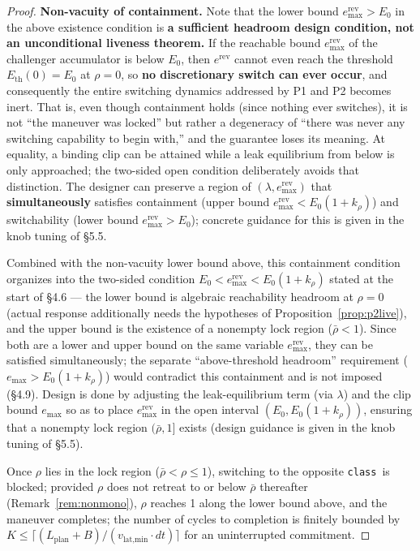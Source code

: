 \documentclass[11pt]{article}
\newcommand{\Class}{\texttt{class}}
\newcommand{\Erev}{e^{\text{rev}}}
\newcommand{\Eremax}{e^{\text{rev}}_{\max}}
\newcommand{\Eth}{E_{\text{th}}}
\begin{document}
\begin{proof}
\textbf{Non-vacuity of containment.} Note that the lower bound $\Eremax > E_0$ in the above existence condition is \textbf{a sufficient headroom design condition, not an unconditional liveness theorem.} If the reachable bound $\Eremax$ of the challenger accumulator is below $E_0$, then $\Erev$ cannot even reach the threshold $\Eth(0) = E_0$ at $\rho=0$, so \textbf{no discretionary switch can ever occur}, and consequently the entire switching dynamics addressed by P1 and P2 becomes inert. That is, even though containment holds (since nothing ever switches), it is not ``the maneuver was locked'' but rather a degeneracy of ``there was never any switching capability to begin with,'' and the guarantee loses its meaning. At equality, a binding clip can be attained while a leak equilibrium from below is only approached; the two-sided open condition deliberately avoids that distinction. The designer can preserve a region of $(\lambda, \Eremax)$ that \textbf{simultaneously} satisfies containment (upper bound $\Eremax < E_0(1+k_\rho)$) and switchability (lower bound $\Eremax > E_0$); concrete guidance for this is given in the knob tuning of \S5.5.

Combined with the non-vacuity lower bound above, this containment condition organizes into the two-sided condition $E_0 < \Eremax < E_0(1+k_\rho)$ stated at the start of \S4.6 --- the lower bound is algebraic reachability headroom at $\rho = 0$ (actual response additionally needs the hypotheses of Proposition~\ref{prop:p2live}), and the upper bound is the existence of a nonempty lock region ($\bar\rho < 1$). Since both are a lower and upper bound on the same variable $\Eremax$, they can be satisfied simultaneously; the separate ``above-threshold headroom'' requirement ($e_{\max} > E_0(1+k_\rho)$) would contradict this containment and is not imposed (\S4.9). Design is done by adjusting the leak-equilibrium term (via $\lambda$) and the clip bound $e_{\max}$ so as to place $\Eremax$ in the open interval $(E_0, E_0(1+k_\rho))$, ensuring that a nonempty lock region $(\bar\rho, 1]$ exists (design guidance is given in the knob tuning of \S5.5).

Once $\rho$ lies in the lock region ($\bar\rho < \rho \le 1$), switching to the opposite \Class\ is blocked; provided $\rho$ does not retreat to or below $\bar\rho$ thereafter (Remark~\ref{rem:nonmono}), $\rho$ reaches 1 along the lower bound above, and the maneuver completes; the number of cycles to completion is finitely bounded by $K \le \lceil(L_{\text{plan}}+B)/(v_{\text{lat,min}} \cdot dt)\rceil$ for an uninterrupted commitment.
\end{proof}
\end{document}
